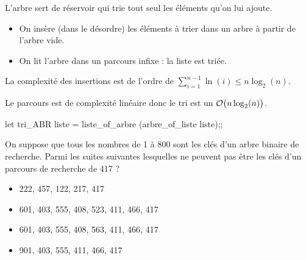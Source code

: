 \begin{Answer}

L'arbre sert de réservoir qui trie tout seul les éléments qu'on lui ajoute.

\begin{itemize}
\item On insère (dans le désordre) les éléments à trier dans un arbre à partir de l'arbre vide.

\item On lit l'arbre dans un parcours infixe : la liste est triée.

\end{itemize}

La complexité des insertions est de l'ordre de $\displaystyle \sum_{i=1}^{n-1} \ln(i)\le n\log_2(n)$.

Le parcours est de complexité linéaire donc le tri est un ${\cal O}\bigl(n\log_2(n)\bigr)$.

\begin{ocaml}
let tri_ABR liste =
  liste_of_arbre (arbre_of_liste liste);;
\end{ocaml}
\end{Answer}
\begin{Exercise}[title =Parcours de recherche]\it

On suppose que tous les nombres de 1 à 800 sont les clés d'un 
arbre binaire de recherche. Parmi les suites suivantes lesquelles ne peuvent pas être les clés d'un parcours de recherche de 417 ?

\begin{itemize}

\item 222, 457, 122, 217, 417

\item 601, 403, 555, 408, 523, 411, 466, 417

\item 601, 403, 555, 408, 563, 411, 466, 417

\item 901, 403, 555, 411, 466, 417
\end{itemize}

\end{Exercise}
